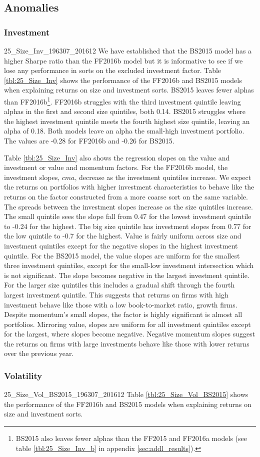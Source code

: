 
\subsection{Anomalies}

\subsubsection{Investment}

{25_Size_Inv_196307_201612}
We have established that the BS2015 model has a higher Sharpe ratio than the FF2016b model but 
it is informative to see if we lose any performance in sorts on the excluded investment factor.
Table \ref{tbl:25_Size_Inv} shows the performance of the FF2016b and BS2015 models when 
explaining returns on size and investment sorts.
BS2015 leaves fewer alphas than FF2016b\footnote{BS2015 also leaves fewer alphas than the 
FF2015 and FF2016a models (see table \ref{tbl:25_Size_Inv_b} in appendix 
\ref{sec:addl_results}).}.
FF2016b struggles with the third investment quintile leaving alphas in the first and second 
size quintiles, both 0.14.
BS2015 struggles where the highest investment quintile meets the fourth highest size quintile, 
leaving an alpha of 0.18.
Both models leave an alpha the small-high investment portfolio.
The values are -0.28 for FF2016b and -0.26 for BS2015.

Table \ref{tbl:25_Size_Inv} also shows the regression slopes on the value and investment or 
value and momentum factors.
For the FF2016b model, the investment slopes, $cma$, decrease as the investment quintiles 
increase.
We expect the returns on portfolios with higher investment characteristics to behave like the 
returns on the factor constructed from a more coarse sort on the same variable.
The spreads between the investment slopes increase as the size quintiles increase.
The small quintile sees the slope fall from 0.47 for the lowest investment quintile to -0.24 
for the highest.
The big size quintile has investment slopes from 0.77 for the low quintile to -0.7 for the 
highest.
Value is fairly uniform across size and investment quintiles except for the negative slopes in 
the highest investment quintile.
For the BS2015 model, the value slopes are uniform for the smallest three investment 
quintiles, except for the small-low investment intersection which is not significant.
The slope becomes negative in the largest investment quintile.
For the larger size quintiles this includes a gradual shift through the fourth largest 
investment quintile.
This suggests that returns on firms with high investment behave like those with a low 
book-to-market ratio, growth firms.
Despite momentum's small slopes, the factor is highly significant is almost all portfolios.
Mirroring value, slopes are uniform for all investment quintiles except for the largest, where 
slopes become negative.
Negative momentum slopes suggest the returns on firms with large investments behave like those 
with lower returns over the previous year.

\subsubsection{Volatility}

{25_Size_Vol_BS2015_196307_201612}
Table \ref{tbl:25_Size_Vol_BS2015} shows the performance of the FF2016b and BS2015 models
when explaining returns on size and investment sorts.

